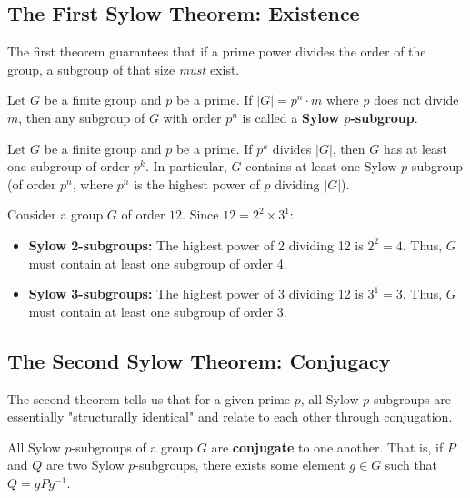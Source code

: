 \subsection{The First Sylow Theorem: Existence}
The first theorem guarantees that if a prime power divides the order of the group, a subgroup of that size \textit{must} exist.

\begin{definition}
Let $G$ be a finite group and $p$ be a prime. If $|G| = p^n \cdot m$ where $p$ does not divide $m$, then any subgroup of $G$ with order $p^n$ is called a \textbf{Sylow $p$-subgroup}.
\end{definition}

\begin{theorem}
Let $G$ be a finite group and $p$ be a prime. If $p^k$ divides $|G|$, then $G$ has at least one subgroup of order $p^k$. In particular, $G$ contains at least one Sylow $p$-subgroup (of order $p^n$, where $p^n$ is the highest power of $p$ dividing $|G|$).
\end{theorem}

\begin{example}
Consider a group $G$ of order $12$. Since $12 = 2^2 \times 3^1$:
\begin{itemize}
    \item \textbf{Sylow 2-subgroups:} The highest power of 2 dividing 12 is $2^2 = 4$. Thus, $G$ must contain at least one subgroup of order 4.
    \item \textbf{Sylow 3-subgroups:} The highest power of 3 dividing 12 is $3^1 = 3$. Thus, $G$ must contain at least one subgroup of order 3.
\end{itemize}
\end{example}

\subsection{The Second Sylow Theorem: Conjugacy}
The second theorem tells us that for a given prime $p$, all Sylow $p$-subgroups are essentially "structurally identical" and relate to each other through conjugation.

\begin{theorem}
All Sylow $p$-subgroups of a group $G$ are \textbf{conjugate} to one another. That is, if $P$ and $Q$ are two Sylow $p$-subgroups, there exists some element $g \in G$ such that $Q = gPg^{-1}$.
\end{theorem}

